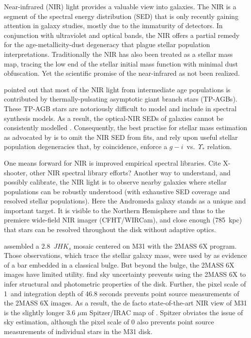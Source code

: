 \documentclass[iop]{emulateapj}
\newcommand{\todo}[1]{\textcolor{BurntOrange}{\textsf{#1}}} %
\begin{document}
Near-infrared (NIR) light provides a valuable view into galaxies.
The NIR is a segment of the spectral energy distribution (SED) that is only recently gaining attention in galaxy studies, mostly due to the immaturity of detectors.
In conjunction with ultraviolet and optical bands, the NIR offers a partial remedy for the age-metallicity-dust degeneracy that plague stellar population interpretations. 
Traditionally the NIR has also been treated as a stellar mass map, tracing the low end of the stellar initial mass function with minimal dust obfuscation.
Yet the scientific promise of the near-infrared as not been realized.

\cite{Maraston:1998} pointed out that most of the NIR light from intermediate age populations is contributed by thermally-pulsating asymptotic giant branch stars (TP-AGBs).
These TP-AGB stars are notoriously difficult to model and include in spectral synthesis models.
As a result, the optical-NIR SEDs of galaxies cannot be consistently modelled \citep{Taylor:2011}.
Consequently, the best practise for stellar mass estimation as advocated by \cite{Taylor:2011} is to omit the NIR SED from fits, and rely upon useful stellar population degeneracies that, by coincidence, enforce a $g-i$~vs.~$\Upsilon_*$ relation.

One means forward for NIR is improved empirical spectral libraries. 
\todo{Cite X-shooter, other NIR spectral library efforts?}
Another way to understand, and possibly calibrate, the NIR light is to observe nearby galaxies where stellar populations can be robustly understood (with exhaustive SED coverage and resolved stellar populations).
Here the Andromeda galaxy stands as a unique and important target.
It is visible to the Northern Hemisphere and thus to the premiere wide-field NIR imager (CFHT/WIRCam), and close enough (785~kpc) that stars can be resolved throughout the disk without adaptive optics.

\cite{Beaton:2007} assembled a 2.8\arcdeg\ $JHK_s$ mosaic centered on M31 with the 2MASS 6X program.
Those observations, which trace the stellar galaxy mass, were used by \cite{Athanassoula:2006} as evidence of a bar embedded in a classical bulge.
But beyond the bulge, the 2MASS 6X images have limited utility.
\cite{Courteau:2011} find sky uncertainty prevents using the 2MASS 6X to infer structural and photometric properties of the disk.
Further, the pixel scale of 1\arcsec\ and integration depth of 46.8 seconds prevents point source measurements of the 2MASS 6X images.
As a result, the de facto state-of-the-art NIR view of M31 is the slightly longer 3.6 $\mu$m Spitzer/IRAC map of \cite{Barmby:2006}.
Spitzer obviates the issue of sky estimation, although the pixel scale of 0 also prevents point source measurements of individual stars in the M31 disk.
\end{document}
